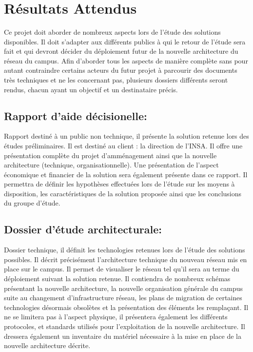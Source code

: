 \section{Résultats Attendus}
\paragraph{} Ce projet doit aborder de nombreux aspects lors de l'étude des solutions disponibles. Il doit s'adapter aux différents publics à qui le retour de l'étude sera fait et qui devront décider du déploiement futur de la nouvelle architecture du réseau du campus. Afin d'aborder tous les aspects de manière complète sans pour autant contraindre certains acteurs du futur projet à parcourir des documents très techniques et ne les concernant pas, plusieurs dossiers différents seront rendus, chacun ayant un objectif et un destinataire précis. \\


\subsection{Rapport d'aide décisionelle:} Rapport destiné à un public non technique, il présente la solution retenue lors  des études préliminaires. Il est destiné au client : la direction de l'INSA. Il offre une présentation complète du projet d'amménagement ainsi que la nouvelle architecture (technique, organisationnelle). Une présentation de l'aspect économique et financier de la solution sera également présente dans ce rapport. Il permettra de définir les hypothèses effectuées lors de l'étude sur les moyens à disposition, les caractéristiques de la solution proposée ainsi que les conclusions du groupe d'étude.

\subsection{Dossier d'étude architecturale:} Dossier technique, il définit les technologies retenues lors de l'étude des solutions possibles. Il décrit précisément l'architecture technique du nouveau réseau mis en place sur le campus. Il permet de visualiser le réseau tel qu'il sera au terme du déploiement suivant la solution retenue. Il contiendra de nombreux schémas présentant la nouvelle architecture, la nouvelle organisation générale du campus suite au changement d'infrastructure réseau, les plans de migration de certaines technologies désormais obsolètes et la présentation des éléments les remplaçant. Il ne se limitera pas à l'aspect physique, il présentera également les différents protocoles, et standards utilisés pour l'exploitation de la nouvelle architecture. Il dressera également un inventaire du matériel nécessaire à la mise en place de la nouvelle architecture décrite.

